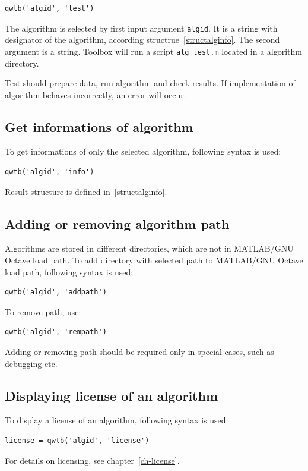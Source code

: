 \documentclass[12pt,a4paper,oneside]{report} %
\def\matlab{{\sc MATLAB}\xspace}
\def\octave{{\sc GNU Octave}\xspace}
\def\mgo{\matlab/\octave\xspace}
\begin{document}
\begin{lstlisting}
qwtb('algid', 'test')
\end{lstlisting}

The algorithm is selected by first input argument \lstinline{algid}. It is a string with
designator of the algorithm, according structrue~\ref{structalginfo}. The second argument is a
string. Toolbox will run a script \lstinline{alg_test.m} located in a algorithm directory.

Test should prepare data, run algorithm and check results. If implementation of algorithm
behaves incorrectly, an error will occur.

\subsection{Get informations of algorithm} %
To get informations of only the selected algorithm, following syntax is used:
\begin{lstlisting}
qwtb('algid', 'info')
\end{lstlisting}

Result structure is defined in~\ref{structalginfo}.

\subsection{Adding or removing algorithm path} %
Algorithms are stored in different directories, which are not in \mgo load path. To add directory
with selected path to \mgo load path, following syntax is used:

\begin{lstlisting}
qwtb('algid', 'addpath')
\end{lstlisting}

To remove path, use:

\begin{lstlisting}
qwtb('algid', 'rempath')
\end{lstlisting}

Adding or removing path should be required only in special cases, such as debugging etc.

\subsection{Displaying license of an algorithm} %
To display a license of an algorithm, following syntax is used:
\begin{lstlisting}
license = qwtb('algid', 'license')
\end{lstlisting}
For details on licensing, see chapter~\ref{ch-license}.
\end{document}
